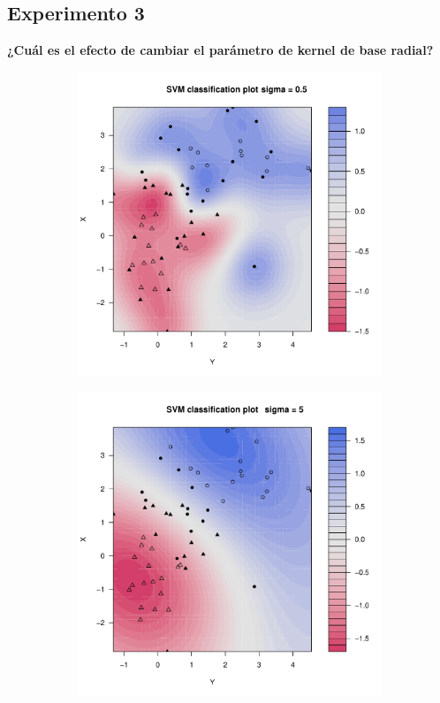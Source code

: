 \subsection*{Experimento 3}

\textbf{¿Cuál es el efecto de cambiar el parámetro de kernel de base radial?}

\begin{figure}[H]
	\centering
	\begin{subfigure}{0.24\linewidth}
		\includegraphics[width=1\linewidth]{Graphics/Problema_01/Experiment_03_1.pdf}
		\caption{}
	\end{subfigure}
	\begin{subfigure}{0.24\linewidth}
		\includegraphics[width=1\linewidth]{Graphics/Problema_01/Experiment_03_2.pdf}

\end{subfigure}
\end{figure}
